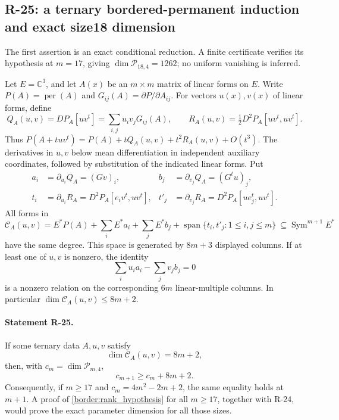\subsection{R-25: a ternary bordered-permanent induction and exact size18 dimension}

The first assertion is an exact conditional reduction. A finite
certificate verifies its hypothesis at $m=17$, giving
$\dim\mathcal P_{18,4}=1262$; no uniform vanishing is inferred.

Let $E=\mathbb C^3$, and let $A(x)$ be an $m\times m$ matrix of
linear forms on $E$. Write $P(A)=\operatorname{per}(A)$ and
$G_{ij}(A)=\partial P/\partial A_{ij}$. For vectors $u(x),v(x)$
of linear forms, define
\[
 Q_A(u,v)=DP_A[uv^t]
          =\sum_{i,j}u_iv_jG_{ij}(A),\qquad
 R_A(u,v)=\tfrac12D^2P_A[uv^t,uv^t].
\]
Thus $P(A+tuv^t)=P(A)+tQ_A(u,v)+t^2R_A(u,v)+O(t^3)$.
The derivatives in $u,v$ below mean differentiation in independent
auxiliary coordinates, followed by substitution of the indicated
linear forms. Put
\begin{align*}
 a_i&=\partial_{u_i}Q_A=(Gv)_i,&
 b_j&=\partial_{v_j}Q_A=(G^tu)_j,\\
 t_i&=\partial_{u_i}R_A
          =D^2P_A[e_iv^t,uv^t],&
 t'_j&=\partial_{v_j}R_A
          =D^2P_A[ue_j^t,uv^t].
\end{align*}
All forms in
\begin{equation}\label{border:C}
 \mathcal C_A(u,v)
 =E^*P(A)
   +\sum_i E^*a_i+\sum_j E^*b_j
   +\operatorname{span}\{t_i,t'_j:1\leq i,j\leq m\}
 \ \subseteq\operatorname{Sym}^{m+1}E^*
\end{equation}
have the same degree. This space is generated by $8m+3$ displayed
columns. If at least one of $u,v$ is nonzero, the identity
\begin{equation}\label{border:scaling_relation}
 \sum_i u_i a_i-\sum_jv_jb_j=0
\end{equation}
is a nonzero relation on the corresponding $6m$ linear-multiple
columns. In particular $\dim\mathcal C_A(u,v)\leq8m+2$.

\paragraph{Statement R-25.}
If some ternary data $A,u,v$ satisfy
\begin{equation}\label{border:rank_hypothesis}
 \dim\mathcal C_A(u,v)=8m+2,
\end{equation}
then, with $c_m=\dim\mathcal P_{m,4}$,
\begin{equation}\label{border:increment}
 c_{m+1}\geq c_m+8m+2.
\end{equation}
Consequently, if $m\geq17$ and $c_m=4m^2-2m+2$, the same
equality holds at $m+1$. A proof of
\eqref{border:rank_hypothesis} for all $m\geq17$, together with
R-24, would prove the exact parameter dimension for all those sizes.

